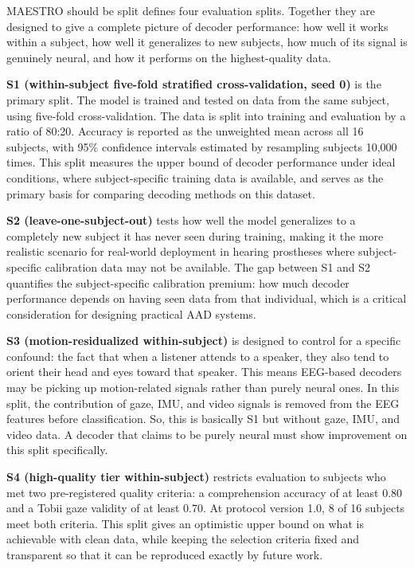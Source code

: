 \documentclass{article}
\begin{document}
MAESTRO should be split defines four evaluation splits. Together they are designed to give 
a complete picture of decoder performance: how well it works within a subject, 
how well it generalizes to new subjects, how much of its signal is genuinely 
neural, and how it performs on the highest-quality data.

\textbf{S1 (within-subject five-fold stratified cross-validation, seed 0)} 
is the primary split. The model is trained and tested on data from the same 
subject, using five-fold cross-validation. The data is split into training and evaluation by a ratio of 80:20. Accuracy is reported as the 
unweighted mean across all 16 subjects, with 95\% confidence intervals 
estimated by resampling subjects 10{,}000 times. This split measures the upper bound of decoder performance under
ideal conditions, where subject-specific training data is available, and
serves as the primary basis for comparing decoding methods on this dataset.

\textbf{S2 (leave-one-subject-out)} tests how well the model generalizes to a completely new subject it has never seen during training, making it
the more realistic scenario for real-world deployment in hearing prostheses
where subject-specific calibration data may not be available. The gap
between S1 and S2 quantifies the subject-specific calibration premium:
how much decoder performance depends on having seen data from that
individual, which is a critical consideration for designing practical
AAD systems.

\textbf{S3 (motion-residualized within-subject)} is designed to control for 
a specific confound: the fact that when a listener attends to a speaker, they 
also tend to orient their head and eyes toward that speaker. This means 
EEG-based decoders may be picking up motion-related signals rather than 
purely neural ones. In this split, the contribution of gaze, IMU, and video 
signals is removed from the EEG features before classification. So, this is basically S1 but without gaze, IMU, and video data. A decoder 
that claims to be purely neural must show improvement on this split 
specifically.

\textbf{S4 (high-quality tier within-subject)} restricts evaluation to 
subjects who met two pre-registered quality criteria: a comprehension accuracy 
of at least 0.80 and a Tobii gaze validity of at least 0.70. At protocol 
version 1.0, 8 of 16 subjects meet both criteria. This split gives an 
optimistic upper bound on what is achievable with clean data, while keeping 
the selection criteria fixed and transparent so that it can be reproduced 
exactly by future work.
\end{document}
